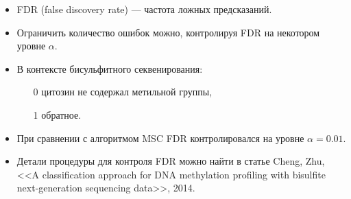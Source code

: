 \documentclass[unicode,mathserif]{beamer}
\begin{document}
\begin{frame}
  \begin{itemize}
  \item FDR (false discovery rate) --- частота ложных предсказаний.
  \item Ограничить количество ошибок можно, контролируя FDR на некотором уровне $\alpha$.
  \item В контексте бисульфитного секвенирования:
    \begin{itemize}
    \item[0] цитозин не содержал метильной группы,
    \item[1] обратное.
    \end{itemize}
  \item При сравнении с алгоритмом MSC FDR контролировался на уровне $\alpha = 0.01$.
  \item Детали процедуры для контроля FDR можно найти в статье
    Cheng, Zhu, <<A classification approach for DNA methylation profiling with bisulfite
    next-generation sequencing data>>, 2014.
  \end{itemize}
\end{frame}
\end{document}

